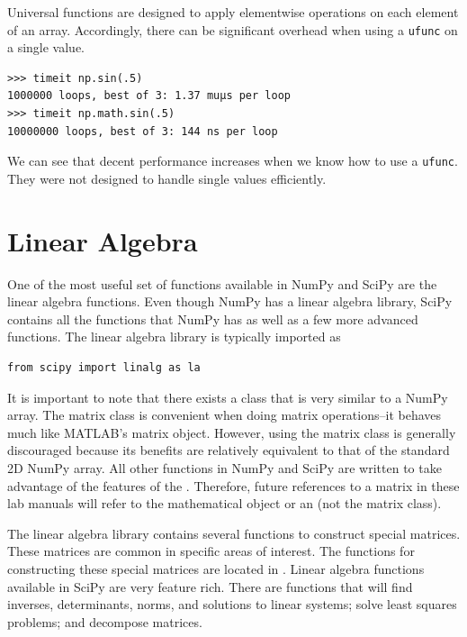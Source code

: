 Universal functions are designed to apply elementwise operations on each 
element of an array. Accordingly, there can be significant overhead 
when using a \texttt{ufunc} on a single value.

\begin{lstlisting}
>>> timeit np.sin(.5)
1000000 loops, best of 3: 1.37 muµs per loop
>>> timeit np.math.sin(.5)
10000000 loops, best of 3: 144 ns per loop
\end{lstlisting}

We can see that decent performance increases when we know how to use a 
\texttt{ufunc}. They were not designed to handle single values efficiently.

\section*{Linear Algebra}
One of the most useful set of functions available in NumPy and SciPy are the 
linear algebra functions. Even though NumPy has a linear algebra library, 
SciPy contains all the functions that NumPy has as well as a few more advanced 
functions. The linear algebra library is typically imported as

\begin{lstlisting}
from scipy import linalg as la
\end{lstlisting}

It is important to note that there exists a  class that is very 
similar to a NumPy array. The matrix class is convenient when doing matrix 
operations--it behaves much like MATLAB's matrix object.
However, using the matrix class is generally discouraged because its benefits 
are relatively equivalent to that of the standard 2D NumPy array. 
All other functions in NumPy and SciPy are written to take advantage 
of the features of the . Therefore, future references to a matrix in these lab 
manuals will refer to the mathematical object or an  (not the matrix class).

The linear algebra library contains several functions to construct special 
matrices. These matrices are common in specific areas of interest.
The functions for constructing these special matrices are located in 
. Linear algebra functions available in SciPy 
are very feature rich. There are functions that will find inverses, 
determinants, norms, and solutions to linear systems; solve least squares 
problems; and decompose matrices.

